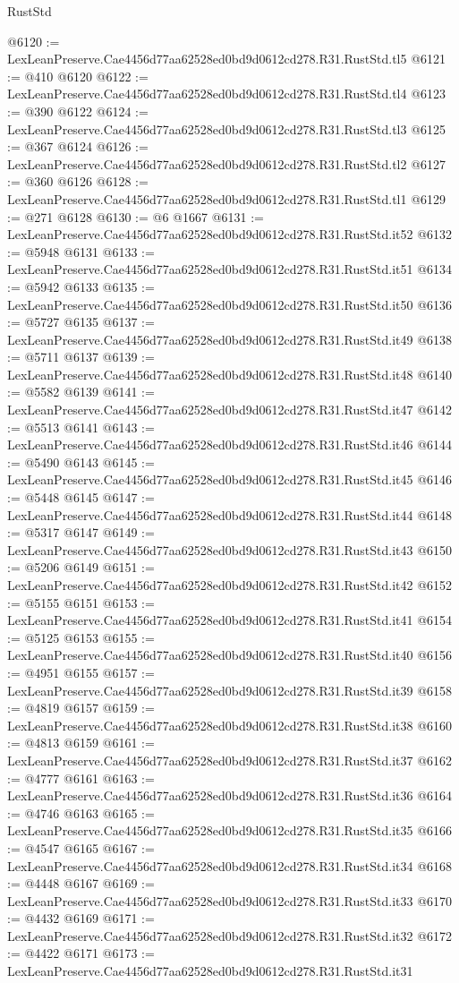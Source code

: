 \begin{lexlean}{RustStd}
\begin{coremodule}
@6120 := LexLeanPreserve.Cae4456d77aa62528ed0bd9d0612cd278.R31.RustStd.tl5
@6121 := @410 @6120
@6122 := LexLeanPreserve.Cae4456d77aa62528ed0bd9d0612cd278.R31.RustStd.tl4
@6123 := @390 @6122
@6124 := LexLeanPreserve.Cae4456d77aa62528ed0bd9d0612cd278.R31.RustStd.tl3
@6125 := @367 @6124
@6126 := LexLeanPreserve.Cae4456d77aa62528ed0bd9d0612cd278.R31.RustStd.tl2
@6127 := @360 @6126
@6128 := LexLeanPreserve.Cae4456d77aa62528ed0bd9d0612cd278.R31.RustStd.tl1
@6129 := @271 @6128
@6130 := @6 @1667
@6131 := LexLeanPreserve.Cae4456d77aa62528ed0bd9d0612cd278.R31.RustStd.it52
@6132 := @5948 @6131
@6133 := LexLeanPreserve.Cae4456d77aa62528ed0bd9d0612cd278.R31.RustStd.it51
@6134 := @5942 @6133
@6135 := LexLeanPreserve.Cae4456d77aa62528ed0bd9d0612cd278.R31.RustStd.it50
@6136 := @5727 @6135
@6137 := LexLeanPreserve.Cae4456d77aa62528ed0bd9d0612cd278.R31.RustStd.it49
@6138 := @5711 @6137
@6139 := LexLeanPreserve.Cae4456d77aa62528ed0bd9d0612cd278.R31.RustStd.it48
@6140 := @5582 @6139
@6141 := LexLeanPreserve.Cae4456d77aa62528ed0bd9d0612cd278.R31.RustStd.it47
@6142 := @5513 @6141
@6143 := LexLeanPreserve.Cae4456d77aa62528ed0bd9d0612cd278.R31.RustStd.it46
@6144 := @5490 @6143
@6145 := LexLeanPreserve.Cae4456d77aa62528ed0bd9d0612cd278.R31.RustStd.it45
@6146 := @5448 @6145
@6147 := LexLeanPreserve.Cae4456d77aa62528ed0bd9d0612cd278.R31.RustStd.it44
@6148 := @5317 @6147
@6149 := LexLeanPreserve.Cae4456d77aa62528ed0bd9d0612cd278.R31.RustStd.it43
@6150 := @5206 @6149
@6151 := LexLeanPreserve.Cae4456d77aa62528ed0bd9d0612cd278.R31.RustStd.it42
@6152 := @5155 @6151
@6153 := LexLeanPreserve.Cae4456d77aa62528ed0bd9d0612cd278.R31.RustStd.it41
@6154 := @5125 @6153
@6155 := LexLeanPreserve.Cae4456d77aa62528ed0bd9d0612cd278.R31.RustStd.it40
@6156 := @4951 @6155
@6157 := LexLeanPreserve.Cae4456d77aa62528ed0bd9d0612cd278.R31.RustStd.it39
@6158 := @4819 @6157
@6159 := LexLeanPreserve.Cae4456d77aa62528ed0bd9d0612cd278.R31.RustStd.it38
@6160 := @4813 @6159
@6161 := LexLeanPreserve.Cae4456d77aa62528ed0bd9d0612cd278.R31.RustStd.it37
@6162 := @4777 @6161
@6163 := LexLeanPreserve.Cae4456d77aa62528ed0bd9d0612cd278.R31.RustStd.it36
@6164 := @4746 @6163
@6165 := LexLeanPreserve.Cae4456d77aa62528ed0bd9d0612cd278.R31.RustStd.it35
@6166 := @4547 @6165
@6167 := LexLeanPreserve.Cae4456d77aa62528ed0bd9d0612cd278.R31.RustStd.it34
@6168 := @4448 @6167
@6169 := LexLeanPreserve.Cae4456d77aa62528ed0bd9d0612cd278.R31.RustStd.it33
@6170 := @4432 @6169
@6171 := LexLeanPreserve.Cae4456d77aa62528ed0bd9d0612cd278.R31.RustStd.it32
@6172 := @4422 @6171
@6173 := LexLeanPreserve.Cae4456d77aa62528ed0bd9d0612cd278.R31.RustStd.it31

\end{coremodule}
\end{lexlean}
